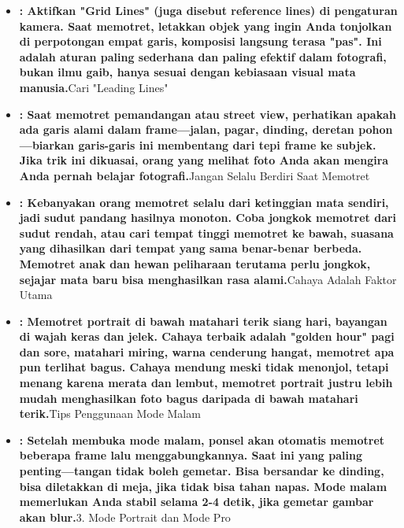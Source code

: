 \begin{itemize}
  \item \textbf{: Aktifkan "Grid Lines" (juga disebut reference lines) di pengaturan kamera. Saat memotret, letakkan objek yang ingin Anda tonjolkan di perpotongan empat garis, komposisi langsung terasa "pas". Ini adalah aturan paling sederhana dan paling efektif dalam fotografi, bukan ilmu gaib, hanya sesuai dengan kebiasaan visual mata manusia.}Cari "Leading Lines"
  \item \textbf{: Saat memotret pemandangan atau street view, perhatikan apakah ada garis alami dalam frame—jalan, pagar, dinding, deretan pohon—biarkan garis-garis ini membentang dari tepi frame ke subjek. Jika trik ini dikuasai, orang yang melihat foto Anda akan mengira Anda pernah belajar fotografi.}Jangan Selalu Berdiri Saat Memotret
  \item \textbf{: Kebanyakan orang memotret selalu dari ketinggian mata sendiri, jadi sudut pandang hasilnya monoton. Coba jongkok memotret dari sudut rendah, atau cari tempat tinggi memotret ke bawah, suasana yang dihasilkan dari tempat yang sama benar-benar berbeda. Memotret anak dan hewan peliharaan terutama perlu jongkok, sejajar mata baru bisa menghasilkan rasa alami.}Cahaya Adalah Faktor Utama
  \item \textbf{: Memotret portrait di bawah matahari terik siang hari, bayangan di wajah keras dan jelek. Cahaya terbaik adalah "golden hour" pagi dan sore, matahari miring, warna cenderung hangat, memotret apa pun terlihat bagus. Cahaya mendung meski tidak menonjol, tetapi menang karena merata dan lembut, memotret portrait justru lebih mudah menghasilkan foto bagus daripada di bawah matahari terik.}Tips Penggunaan Mode Malam
  \item \textbf{: Setelah membuka mode malam, ponsel akan otomatis memotret beberapa frame lalu menggabungkannya. Saat ini yang paling penting—tangan tidak boleh gemetar. Bisa bersandar ke dinding, bisa diletakkan di meja, jika tidak bisa tahan napas. Mode malam memerlukan Anda stabil selama 2-4 detik, jika gemetar gambar akan blur.}3. Mode Portrait dan Mode Pro
\end{itemize}


